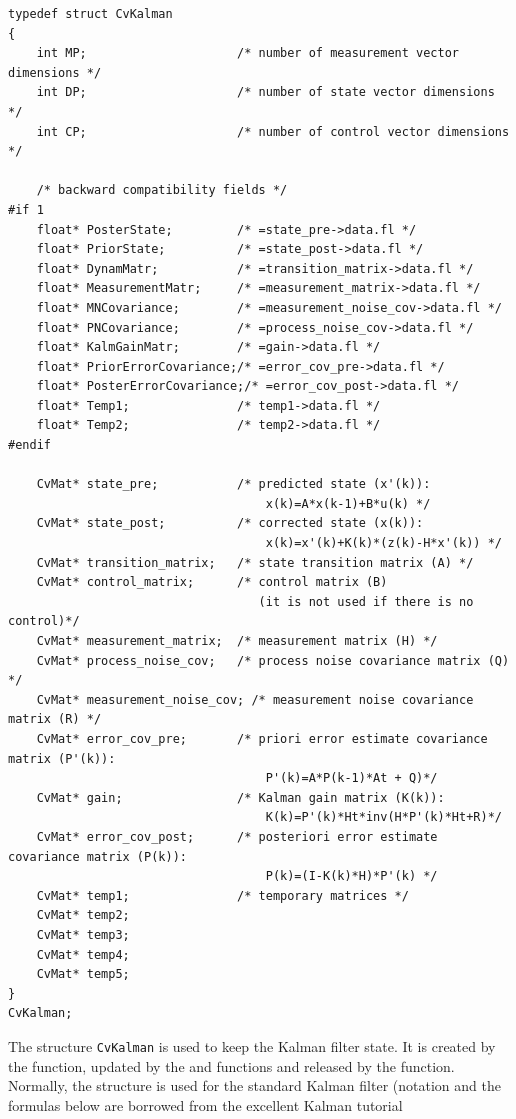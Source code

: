 \begin{lstlisting}
typedef struct CvKalman
{
    int MP;                     /* number of measurement vector dimensions */
    int DP;                     /* number of state vector dimensions */
    int CP;                     /* number of control vector dimensions */

    /* backward compatibility fields */
#if 1
    float* PosterState;         /* =state_pre->data.fl */
    float* PriorState;          /* =state_post->data.fl */
    float* DynamMatr;           /* =transition_matrix->data.fl */
    float* MeasurementMatr;     /* =measurement_matrix->data.fl */
    float* MNCovariance;        /* =measurement_noise_cov->data.fl */
    float* PNCovariance;        /* =process_noise_cov->data.fl */
    float* KalmGainMatr;        /* =gain->data.fl */
    float* PriorErrorCovariance;/* =error_cov_pre->data.fl */
    float* PosterErrorCovariance;/* =error_cov_post->data.fl */
    float* Temp1;               /* temp1->data.fl */
    float* Temp2;               /* temp2->data.fl */
#endif

    CvMat* state_pre;           /* predicted state (x'(k)):
                                    x(k)=A*x(k-1)+B*u(k) */
    CvMat* state_post;          /* corrected state (x(k)):
                                    x(k)=x'(k)+K(k)*(z(k)-H*x'(k)) */
    CvMat* transition_matrix;   /* state transition matrix (A) */
    CvMat* control_matrix;      /* control matrix (B)
                                   (it is not used if there is no control)*/
    CvMat* measurement_matrix;  /* measurement matrix (H) */
    CvMat* process_noise_cov;   /* process noise covariance matrix (Q) */
    CvMat* measurement_noise_cov; /* measurement noise covariance matrix (R) */
    CvMat* error_cov_pre;       /* priori error estimate covariance matrix (P'(k)):
                                    P'(k)=A*P(k-1)*At + Q)*/
    CvMat* gain;                /* Kalman gain matrix (K(k)):
                                    K(k)=P'(k)*Ht*inv(H*P'(k)*Ht+R)*/
    CvMat* error_cov_post;      /* posteriori error estimate covariance matrix (P(k)):
                                    P(k)=(I-K(k)*H)*P'(k) */
    CvMat* temp1;               /* temporary matrices */
    CvMat* temp2;
    CvMat* temp3;
    CvMat* temp4;
    CvMat* temp5;
}
CvKalman;
\end{lstlisting}

The structure \texttt{CvKalman} is used to keep the Kalman filter
state. It is created by the  function, updated
by the  and  functions
and released by the  function. Normally, the
structure is used for the standard Kalman filter (notation and the
formulas below are borrowed from the excellent Kalman tutorial


